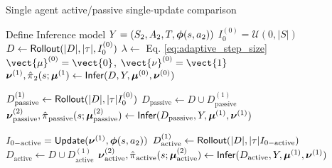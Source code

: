 \begin{algorithm}
    \caption{Single agent active/passive single-update comparison}
    \label{alg:single_agent_single_update}
    \begin{algorithmic}[1]
        \State Define Inference model $Y=(S_2,A_2,T,\boldsymbol{\mathbb{\phi}}(s, a_2))$
        \State $I_0^{(0)} = \mathcal{U}(0,|S|)$
        \State $D \leftarrow \mathsf{Rollout}(|D|,|\tau|,I_0^{(0)})$
        \State $\lambda \leftarrow $ Eq. \ref{eq:adaptive_step_size}
        \State $\vect{\mu}^{(0)} = \vect{0}$, $\vect{\nu}^{(0)} = \vect{1}$
        \State $\boldsymbol{\mathbb{\nu}}^{(1)} , \hat{\pi_{}}_2(s;\boldsymbol{\mathbb{\mu}}^{(1}) \leftarrow
                \mathsf{Infer}(D,Y,\boldsymbol{\mathbb{\mu}}^{(0)}, \boldsymbol{\mathbb{\nu}}^{(0)} )$ 
        \State %

        \State $D^{(1)}_{\text{passive}} \leftarrow \mathsf{Rollout}(|D|,|\tau|I_0^{(0)})$
        \State $D_{\text{passive}} \leftarrow D \cup D^{(1)}_{\text{passive}}$
        \State $\boldsymbol{\mathbb{\nu}}^{(2)}_{\text{passive}} ,
                \hat{\pi_{}}_{\text{passive}}(s;\boldsymbol{\mathbb{\mu}}^{(2)}_{\text{passive}}) \leftarrow
                \mathsf{Infer}(D_{\text{passive}},Y,\boldsymbol{\mathbb{\mu}}^{(1)}, \boldsymbol{\mathbb{\nu}}^{(1)} )$ 
        \State %

        \State $I_{0-\text{active}} = \mathsf{Update}(\boldsymbol{\mathbb{\nu}}^{(1)}, \boldsymbol{\mathbb{\phi}}(s, a_2))$
        \State $D^{(1)}_{\text{active}} \leftarrow \mathsf{Rollout}(|D|,|\tau|I_{0-\text{active}})$
        \State $D_{\text{active}} \leftarrow D \cup D^{(1)}_{\text{active}}$
        \State $\boldsymbol{\mathbb{\nu}}^{(2)}_{\text{active}} ,
                \hat{\pi_{}}_{\text{active}}(s;\boldsymbol{\mathbb{\mu}}^{(2)}_{\text{active}})
        \leftarrow \mathsf{Infer}(D_{\text{active}},Y,\boldsymbol{\mathbb{\mu}}^{(1)}, \boldsymbol{\mathbb{\nu}}^{(1)} )$
    \end{algorithmic}
\end{algorithm}

\begin{figure}[htb]
    \begin{center}
    \end{center}
\end{figure}

